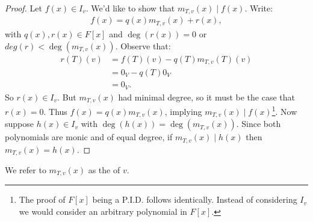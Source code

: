 \begin{proof}
            Let $f(x) \in I_v$. We'd like to show that $m_{T,v}(x) \mid f(x)$. Write:
                \begin{equation*}
                \begin{split}
                    f(x) = q(x)m_{T,v}(x) + r(x),
                \end{split}
                \end{equation*}
            with $q(x),r(x) \in F[x]$ and $\deg(r(x)) = 0$ or $deg(r) < \deg(m_{T,v}(x))$. Observe that:
                \begin{equation*}
                \begin{split}
                    r(T)(v) &= f(T)(v) - q(T)m_{T,v}(T)(v) \\
                    & = 0_V - q(T)0_V \\
                    & = 0_V.
                \end{split}
                \end{equation*}
            So $r(x) \in I_v$. But $m_{T,v}(x)$ had minimal degree, so it must be the case that $r(x) = 0$. Thus $f(x) = q(x)m_{T,v}(x)$, implying $m_{T,v}(x) \mid f(x)$\footnote{The proof of $F[x]$ being a P.I.D. follows identically. Instead of considering $I_v$ we would consider an arbitrary polynomial in $F[x]$.}. Now suppose $h(x) \in I_v$ with $\deg(h(x)) = \deg(m_{T,v}(x))$. Since both polynomials are monic and of equal degree, if $m_{T,v}(x) \mid h(x)$ then $m_{T,v}(x) = h(x)$.
        \end{proof}

    \begin{definition}
        We refer to $m_{T,v}(x)$ as the  of $v$.
    \end{definition}

    \begin{example}
        
    \end{example}
    

    


